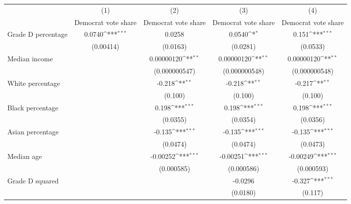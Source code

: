 {
\def\sym#1{\ifmmode^{#1}\else\(^{#1}\)\fi}
\begin{tabular}{l*{4}{c}}
\toprule
                    &\multicolumn{1}{c}{(1)}&\multicolumn{1}{c}{(2)}&\multicolumn{1}{c}{(3)}&\multicolumn{1}{c}{(4)}\\
                    &\multicolumn{1}{c}{Democrat vote share}&\multicolumn{1}{c}{Democrat vote share}&\multicolumn{1}{c}{Democrat vote share}&\multicolumn{1}{c}{Democrat vote share}\\
\midrule
Grade D percentage  &      0.0740\sym{***}&      0.0258         &      0.0540\sym{*}  &       0.151\sym{***}\\
                    &   (0.00414)         &    (0.0163)         &    (0.0281)         &    (0.0533)         \\
\addlinespace
Median income       &                     &  0.00000120\sym{**} &  0.00000120\sym{**} &  0.00000120\sym{**} \\
                    &                     &(0.000000547)         &(0.000000548)         &(0.000000548)         \\
\addlinespace
White percentage    &                     &      -0.218\sym{**} &      -0.218\sym{**} &      -0.217\sym{**} \\
                    &                     &     (0.100)         &     (0.100)         &     (0.100)         \\
\addlinespace
Black percentage    &                     &       0.198\sym{***}&       0.198\sym{***}&       0.198\sym{***}\\
                    &                     &    (0.0355)         &    (0.0354)         &    (0.0356)         \\
\addlinespace
Asian percentage    &                     &      -0.135\sym{***}&      -0.135\sym{***}&      -0.135\sym{***}\\
                    &                     &    (0.0474)         &    (0.0474)         &    (0.0473)         \\
\addlinespace
Median age          &                     &    -0.00252\sym{***}&    -0.00251\sym{***}&    -0.00249\sym{***}\\
                    &                     &  (0.000585)         &  (0.000586)         &  (0.000593)         \\
\addlinespace
Grade D squared     &                     &                     &     -0.0296         &      -0.327\sym{***}\\
                    &                     &                     &    (0.0180)         &     (0.117)         \\

\end{tabular}}
